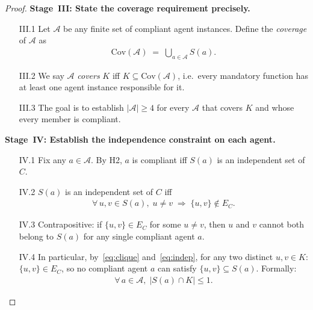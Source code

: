 \documentclass[12pt]{article}
\theoremstyle{definition}
\begin{document}
\begin{proof}
\medskip
\noindent\textbf{Stage~III: State the coverage requirement precisely.}
\begin{enumerate}
    \item[III.1] Let $\mathcal{A}$ be any finite set of compliant agent
                 instances. Define the \emph{coverage} of $\mathcal{A}$
                 as
                 \begin{align}
                     \label{eq:coverage}
                     \mathrm{Cov}(\mathcal{A})
                     \;=\;
                     \bigcup_{a \in \mathcal{A}} S(a).
                 \end{align}
    \item[III.2] We say $\mathcal{A}$ \emph{covers} $K$ iff
                 $K \subseteq \mathrm{Cov}(\mathcal{A})$, i.e.\ every
                 mandatory function has at least one agent instance
                 responsible for it.
    \item[III.3] The goal is to establish
                 $|\mathcal{A}| \geq 4$
                 for every $\mathcal{A}$ that covers $K$ and whose
                 every member is compliant.
\end{enumerate}

\medskip
\noindent\textbf{Stage~IV: Establish the independence constraint on
each agent.}
\begin{enumerate}
    \item[IV.1] Fix any $a \in \mathcal{A}$.  By H2, $a$ is compliant
                iff $S(a)$ is an independent set of $C$.
    \item[IV.2] $S(a)$ is an independent set of $C$ iff
                \begin{align}
                    \label{eq:indep}
                    \forall\, u, v \in S(a),\;
                    u \neq v
                    \;\Longrightarrow\;
                    \{u,v\} \notin E_C.
                \end{align}
    \item[IV.3] Contrapositive: if $\{u,v\} \in E_C$ for some
                $u \neq v$, then $u$ and $v$ cannot both belong to
                $S(a)$ for any single compliant agent $a$.
    \item[IV.4] In particular, by~\eqref{eq:clique} and~\eqref{eq:indep},
                for any two distinct $u, v \in K$:
                $\{u,v\} \in E_C$, so no compliant agent $a$ can satisfy
                $\{u,v\} \subseteq S(a)$.
                Formally:
                \begin{align}
                    \label{eq:no-two-in-K}
                    \forall\, a \in \mathcal{A},\;
                    |S(a) \cap K| \leq 1.
                \end{align}
\end{enumerate}


\end{proof}
\end{document}
